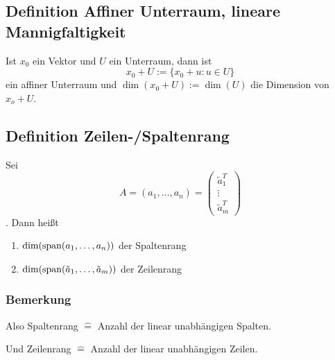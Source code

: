 \subsection{Definition Affiner Unterraum, lineare Mannigfaltigkeit}
Ist $x_0$ ein Vektor und $U$ ein Unterraum, dann ist
\begin{equation*}
    x_0 + U := \{ x_0 + u: u \in U\}
\end{equation*}
ein affiner Unterraum und $\dim(x_0 + U) := \dim(U)$ die Dimension von $x_o + U$.

\subsection{Definition Zeilen-/Spaltenrang}
Sei
\begin{equation*}
    A = (a_1, \ldots, a_n) =
    \begin{pmatrix}
        \tilde{a}_1^T \\ \vdots \\ \tilde{a}_m^T
    \end{pmatrix}
\end{equation*}
. Dann heißt
\begin{enumerate}[label= (\alph*)]
    \item $\dim(\operatorname{span}(a_1, \ldots, a_n))$ der Spaltenrang
    \item $\dim(\operatorname{span}(\tilde{a}_1, \ldots, \tilde{a}_m))$ der Zeilenrang
\end{enumerate}

\subsubsection{Bemerkung}
Also Spaltenrang $\widehat{=}$ Anzahl der linear unabhängigen Spalten.

Und Zeilenrang $\widehat{=}$ Anzahl der linear unabhängigen Zeilen.

